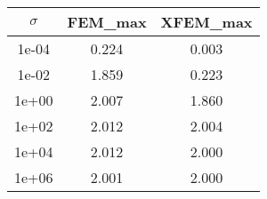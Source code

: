 \documentclass[10pt]{report}
\begin{document}
\begin{table}[H]
\begin{center}
\begin{tabular}{|c|c|c|} \hline
$\sigma$ & FEM_max & XFEM_max\\ \hline
1e-04 & 0.224 & 0.003\\ \hline
1e-02 & 1.859 & 0.223\\ \hline
1e+00 & 2.007 & 1.860\\ \hline
1e+02 & 2.012 & 2.004\\ \hline
1e+04 & 2.012 & 2.000\\ \hline
1e+06 & 2.001 & 2.000\\ \hline
\end{tabular}
\end{center}
\end{table}
\end{document}
